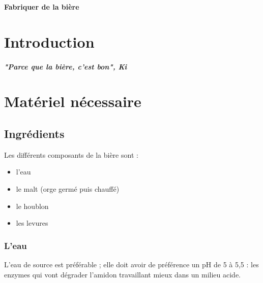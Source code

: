 \documentclass{report}
\begin{document}
\pagestyle{empty} %
\newcommand{\HRule}{\rule{\linewidth}{1mm}}
\begin{center}
\end{center}


\begin{center}
  \large
  \textbf{Fabriquer de la bière}\\
  \huge

  \small

\end{center}

\chapter{Introduction}
\paragraph{"Parce que la bière, c'est bon", Ki}

\chapter{Matériel nécessaire}
\section{Ingrédients}
Les différents composants de la bière sont :
\begin{itemize}
\item    l'eau
\item    le malt (orge germé puis chauffé)
\item    le houblon
\item    les levures
\end{itemize}
 
\subsection*{L'eau}

L'eau de source est préférable ; elle doit avoir de préférence un pH de 5 à 5,5 : les enzymes qui vont dégrader l'amidon travaillant mieux dans un milieu acide.
 
\end{document}

